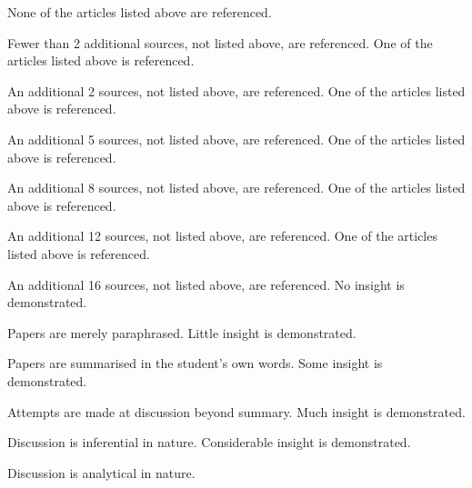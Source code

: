 \documentclass{../../fal_assignment}
\begin{document}
\begin{markingrubric}
%
%
        \grade\fail	None of the articles listed above are referenced.
        \par		Fewer than 2 additional sources, not listed above, are referenced.
        \grade		One of the articles listed above is referenced.
        \par		An additional 2 sources, not listed above, are referenced.
        \grade		One of the articles listed above is referenced.
        \par		An additional 5 sources, not listed above, are referenced.
        \grade		One of the articles listed above is referenced.
        \par		An additional 8 sources, not listed above, are referenced.
        \grade		One of the articles listed above is referenced.
        \par		An additional 12 sources, not listed above, are referenced.
        \grade		One of the articles listed above is referenced.
        \par		An additional 16 sources, not listed above, are referenced.
%
        \grade\fail No insight is demonstrated.
        \par		Papers are merely paraphrased.
        \grade		Little insight is demonstrated.
        \par		Papers are summarised in the student's own words.
        \grade		Some insight is demonstrated.
        \par		Attempts are made at discussion beyond summary.
        \grade		Much insight is demonstrated.
        \par		Discussion is inferential in nature.
        \grade		Considerable insight is demonstrated.
        \par		Discussion is analytical in nature.

\end{markingrubric}
\end{document}
